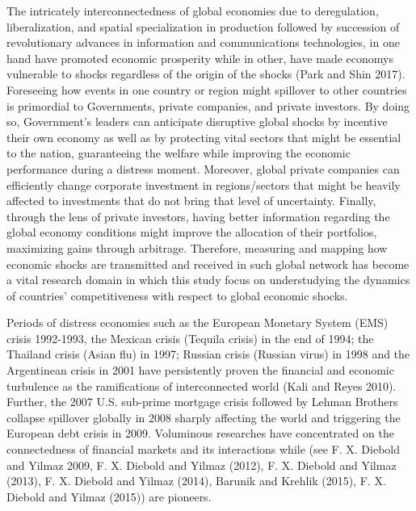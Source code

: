 \documentclass[]{elsarticle} %
\begin{document}
The intricately interconnectedness of global economies due to
deregulation, liberalization, and spatial specialization in production
followed by succession of revolutionary advances in information and
communications technologies, in one hand have promoted economic
prosperity while in other, have made economys vulnerable to shocks
regardless of the origin of the shocks (Park and Shin 2017). Foreseeing
how events in one country or region might spillover to other countries
is primordial to Governments, private companies, and private investors.
By doing so, Government's leaders can anticipate disruptive global
shocks by incentive their own economy as well as by protecting vital
sectors that might be essential to the nation, guaranteeing the welfare
while improving the economic performance during a distress moment.
Moreover, global private companies can efficiently change corporate
investment in regions/sectors that might be heavily affected to
investments that do not bring that level of uncertainty. Finally,
through the lens of private investors, having better information
regarding the global economy conditions might improve the allocation of
their portfolios, maximizing gains through arbitrage. Therefore,
measuring and mapping how economic shocks are transmitted and received
in such global network has become a vital research domain in which this
study focus on understudying the dynamics of countries' competitiveness
with respect to global economic shocks.

Periods of distress economies such as the European Monetary System (EMS)
crisis 1992-1993, the Mexican crisis (Tequila crisis) in the end of
1994; the Thailand crisis (Asian flu) in 1997; Russian crisis (Russian
virus) in 1998 and the Argentinean crisis in 2001 have persistently
proven the financial and economic turbulence as the ramifications of
interconnected world (Kali and Reyes 2010). Further, the 2007 U.S.
sub-prime mortgage crisis followed by Lehman Brothers collapse spillover
globally in 2008 sharply affecting the world and triggering the European
debt crisis in 2009. Voluminous researches have concentrated on the
connectedness of financial markets and its interactions while (see F. X.
Diebold and Yilmaz 2009, F. X. Diebold and Yilmaz (2012), F. X. Diebold
and Yilmaz (2013), F. X. Diebold and Yilmaz (2014), Barunik and Krehlik
(2015), F. X. Diebold and Yilmaz (2015)) are pioneers.
\end{document}
